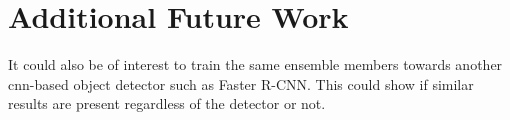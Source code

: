 \section{Additional Future Work}
It could also be of interest to train the same ensemble members towards another \gls{cnn}-based object detector such as Faster R-CNN. This could show if similar results are present regardless of the detector or not.

